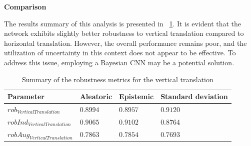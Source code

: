 \vspace{0.3cm}
\textbf{Comparison}
\vspace{0.1cm}

The results summary of this analysis is presented in \Tab~\ref{table:rob_vt}. It is evident that the network exhibits slightly better robustness to vertical translation compared to horizontal translation. However, the overall performance remains poor, and the utilization of uncertainty in this context does not appear to be effective. To address this issue, employing a Bayesian CNN may be a potential solution.

\begin{table}[H]
	\centering
	\begin{tabular}{|| l | l | l | l ||} 
		\hline
		\textbf{Parameter} & \textbf{Aleatoric} & \textbf{Epistemic} & \textbf{Standard deviation} \\
		\hline
		\hline
		$rob_{VerticalTranslation}$ & $0.8994$ & $0.8957$ & $0.9120$ \\
		$robInd_{VerticalTranslation}$ & $0.9065$ & $0.9102$ & $0.8764$ \\
		$robAug_{VerticalTranslation}$ & $0.7863$ & $0.7854$ & $0.7693$ \\	
		\hline
	\end{tabular}	
	\caption{Summary of the robustness metrics for the vertical translation}
	\label{table:rob_vt}
\end{table}
